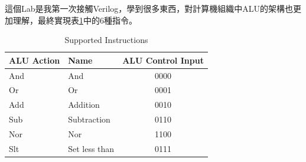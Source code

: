 \documentclass[12pt,a4paper]{article}
\theoremstyle{definition}
\begin{document}
這個Lab是我第一次接觸Verilog，學到很多東西，對計算機組織中ALU的架構也更加理解，最終實現表\ref{tab:support}中的6種指令。

\begin{table}[H]
\centering
\caption
{Supported Instructions}
\label{tab:support}
\begin{tabular}{llc} \toprule
ALU Action & Name & ALU Control Input \\
\midrule
And & And & 0000
\\
Or & Or & 0001
\\
Add & Addition & 0010
\\
Sub & Subtraction & 0110
\\
Nor & Nor & 1100
\\
Slt & Set less than & 0111
\\ \bottomrule
\end{tabular}
\end{table}




\end{document}
